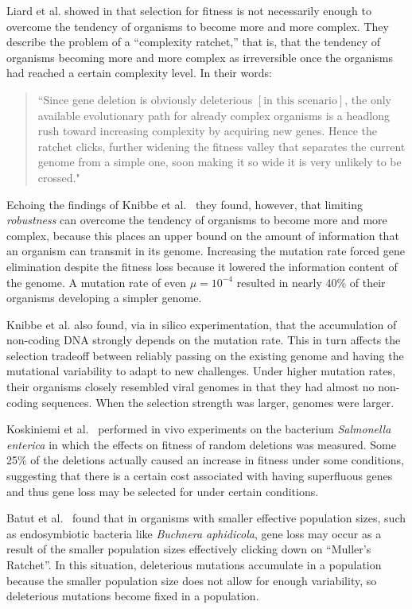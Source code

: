 Liard et al. showed in \cite{Liard.2018} that selection for fitness is not necessarily enough to overcome the tendency of organisms to become more and more complex. They describe the problem of a ``complexity ratchet,'' that is, that the tendency of organisms becoming more and more complex as irreversible once the organisms had reached a certain complexity level. In their words:
\begin{quote}
	``Since gene deletion is obviously deleterious $\left[\text{in this scenario}\right]$, the only available evolutionary path for already complex organisms is a headlong rush toward increasing complexity by acquiring new genes. Hence the ratchet clicks, further widening the fitness valley that separates the current genome from a simple one, soon making it so wide it is very unlikely to be crossed."
\end{quote} 
Echoing the findings of Knibbe et al.~\cite{Knibbe2007} they found, however, that limiting \textit{robustness} can overcome the tendency of organisms to become more and more complex, because this places an upper bound on the amount of information that an organism can transmit in its genome. Increasing the mutation rate forced gene elimination despite the fitness loss because it lowered the information content of the genome. A mutation rate of even $\mu = 10^{-4}$ resulted in nearly 40\% of their organisms developing a simpler genome. 

Knibbe et al. also found, via in silico experimentation, that the accumulation of non-coding DNA strongly depends on the mutation rate. This in turn affects the selection tradeoff between reliably passing on the existing genome and having the mutational variability to adapt to new challenges.  Under higher mutation rates, their organisms closely resembled viral genomes in that they had almost no non-coding sequences. When the selection strength was larger, genomes were larger. 

Koskiniemi et al.~\cite{koskiniemi2012} performed in vivo experiments on the bacterium \textit{Salmonella enterica} in which the effects on fitness of random deletions was measured. Some 25\% of the deletions actually caused an increase in fitness under some conditions, suggesting that there is a certain cost associated with having superfluous genes and thus gene loss may be selected for under certain conditions.

Batut et al.~\cite{Batut.2014} found that in organisms with smaller effective population sizes, such as endosymbiotic bacteria like \textit{Buchnera aphidicola}, gene loss may occur as a result of the smaller population sizes effectively clicking down on ``Muller's Ratchet''. In this situation, deleterious mutations accumulate in a population because the smaller population size does not allow for enough variability, so deleterious mutations become fixed in a population. 

